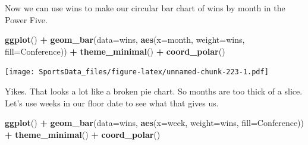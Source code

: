 \documentclass[]{book}
\newenvironment{Shaded}{\begin{snugshade}}{\end{snugshade}}
\newcommand{\DataTypeTok}[1]{\textcolor[rgb]{0.13,0.29,0.53}{#1}}
\newcommand{\KeywordTok}[1]{\textcolor[rgb]{0.13,0.29,0.53}{\textbf{#1}}}
\newcommand{\NormalTok}[1]{#1}
\newcommand{\OperatorTok}[1]{\textcolor[rgb]{0.81,0.36,0.00}{\textbf{#1}}}
\newcommand{\StringTok}[1]{\textcolor[rgb]{0.31,0.60,0.02}{#1}}
\begin{document}
Now we can use wins to make our circular bar chart of wins by month in the Power Five.

\begin{Shaded}
\begin{Highlighting}[]
\KeywordTok{ggplot}\NormalTok{() }\OperatorTok{+}\StringTok{ }\KeywordTok{geom_bar}\NormalTok{(}\DataTypeTok{data=}\NormalTok{wins, }\KeywordTok{aes}\NormalTok{(}\DataTypeTok{x=}\NormalTok{month, }\DataTypeTok{weight=}\NormalTok{wins, }\DataTypeTok{fill=}\NormalTok{Conference)) }\OperatorTok{+}\StringTok{ }\KeywordTok{theme_minimal}\NormalTok{() }\OperatorTok{+}\StringTok{ }\KeywordTok{coord_polar}\NormalTok{()}
\end{Highlighting}
\end{Shaded}

\texttt{[image: SportsData\_files/figure-latex/unnamed-chunk-223-1.pdf]}

Yikes. That looks a lot like a broken pie chart. So months are too thick of a slice. Let's use weeks in our floor date to see what that gives us.

\begin{Shaded}
\end{Shaded}

\begin{Shaded}
\begin{Highlighting}[]
\KeywordTok{ggplot}\NormalTok{() }\OperatorTok{+}\StringTok{ }\KeywordTok{geom_bar}\NormalTok{(}\DataTypeTok{data=}\NormalTok{wins, }\KeywordTok{aes}\NormalTok{(}\DataTypeTok{x=}\NormalTok{week, }\DataTypeTok{weight=}\NormalTok{wins, }\DataTypeTok{fill=}\NormalTok{Conference)) }\OperatorTok{+}\StringTok{ }\KeywordTok{theme_minimal}\NormalTok{() }\OperatorTok{+}\StringTok{ }\KeywordTok{coord_polar}\NormalTok{()}
\end{Highlighting}
\end{Shaded}
\end{document}
